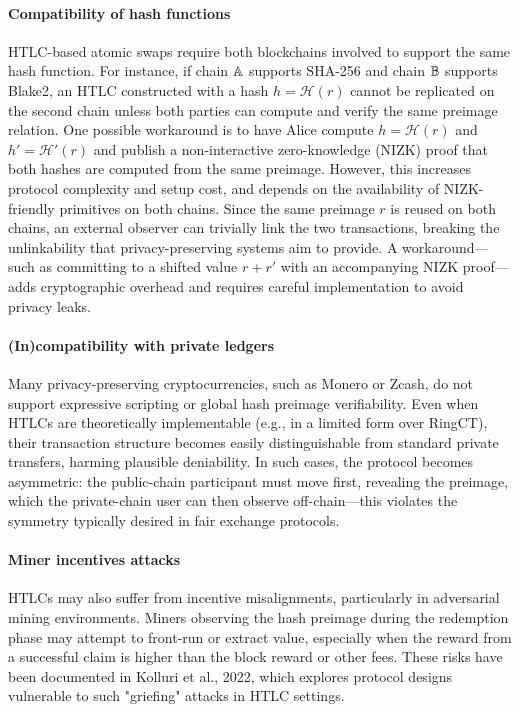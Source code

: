 \paragraph*{Compatibility of hash functions}
HTLC-based atomic swaps require both blockchains involved to support the same hash function. For instance, if chain $\mathbb{A}$ supports SHA-256 and chain $\mathbb{B}$ supports Blake2, an HTLC constructed with a hash $h = \mathcal{H}(r)$ cannot be replicated on the second chain unless both parties can compute and verify the same preimage relation. One possible workaround is to have Alice compute $h = \mathcal{H}(r)$ and $h' = \mathcal{H}'(r)$ and publish a non-interactive zero-knowledge (NIZK) proof that both hashes are computed from the same preimage. However, this increases protocol complexity and setup cost, and depends on the availability of NIZK-friendly primitives on both chains.
Since the same preimage $r$ is reused on both chains, an external observer can trivially link the two transactions, breaking the unlinkability that privacy-preserving systems aim to provide. A workaround—such as committing to a shifted value $r + r'$ with an accompanying NIZK proof—adds cryptographic overhead and requires careful implementation to avoid privacy leaks.
\paragraph*{(In)compatibility with private ledgers}
Many privacy-preserving cryptocurrencies, such as Monero or Zcash, do not support expressive scripting or global hash preimage verifiability. Even when HTLCs are theoretically implementable (e.g., in a limited form over RingCT), their transaction structure becomes easily distinguishable from standard private transfers, harming plausible deniability. In such cases, the protocol becomes asymmetric: the public-chain participant must move first, revealing the preimage, which the private-chain user can then observe off-chain—this violates the symmetry typically desired in fair exchange protocols.
\paragraph*{Miner incentives attacks} HTLCs may also suffer from incentive misalignments, particularly in adversarial mining environments. Miners observing the hash preimage during the redemption phase may attempt to front-run or extract value, especially when the reward from a successful claim is higher than the block reward or other fees. These risks have been documented in Kolluri et al., 2022, which explores protocol designs vulnerable to such "griefing" attacks in HTLC settings.
\newpage

